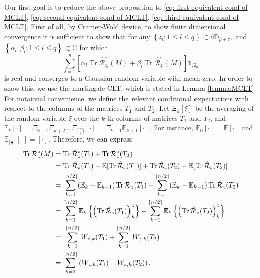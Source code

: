 \documentclass[12pt]{amsart}
\theoremstyle{plain}
\theoremstyle{definition}
\newcommand{\Tr}{\operatorname{Tr}}
\begin{document}
 Our first goal is to reduce the above proposition to \eqref{eq: first equivalent cond of MCLT}, \eqref{eq: second equivalent cond of MCLT}, \eqref{eq: third equivalent cond of MCLT}. First of all, by Cramer-Wold device, to show finite dimensional convergence it is sufficient to show that for any
    $\left\{z_l; 1 \leq l \leq q\right\} \subset \partial \mathbb{D}_{\rho + \tau},$ and $\left\{\alpha_l, \beta_l; 1 \leq l \leq q\right\} \subset \mathbb{C}$ for which
\begin{equation}
    \sum_{l=1}^q\left[\alpha_l \Tr  \hat{\mathcal{R}}_{z_l}^{\circ}(M)+\beta_l \overline{\Tr  \hat{\mathcal{R}}_{z_l}^{\circ}(M)}\right] \mathbf{1}_{\Omega_n}
\end{equation}
is real and converges to a Gaussian random variable with mean zero. In order to show this, we use the martingale CLT, which is stated in Lemma \ref{lemma:MCLT}. For notaional convenience, we define the relevant conditional expectations with respect to the columns of the matrices $T_{1}$ and $T_{2}.$  Let $\Xi_{k}[\xi]$ be the averaging of the random variable $\xi$ over the $k$-th columns of matrices $T_{1}$ and $T_{2}$, and $\mathbb{E}_k[\cdot]=\Xi_{k+1} \Xi_{k+2} \ldots \Xi_{\lceil \frac{n}{2} \rceil}[\cdot]=\Xi_{k+1} \mathbb{E}_{k+1}[\cdot]$. For instance, $\mathbb{E}_0[\cdot]=\mathbb{E}[\cdot]$ and $\mathbb{E}_{\lceil \frac{n}{2}\rceil} [\cdot]=[\cdot]$. Therefore, we can express
\begin{align}
    \Tr  \hat{\mathcal{R}}_z^{\circ}(M) \notag
    &= \Tr  \hat{\mathcal{R}}_z^{\circ}(T_1)+\Tr  \hat{\mathcal{R}}_z^{\circ}(T_2)\\
    &=\Tr \hat{\mathcal{R}}_{z}(T_1)-\mathbb{E}[\Tr \hat{\mathcal{R}}_{z}(T_1)]+\Tr \hat{\mathcal{R}}_{z}(T_2)-\mathbb{E}[\Tr \hat{\mathcal{R}}_{z}(T_2)] \notag\\
    &=   \sum_{k=1}^{\lceil n/2\rceil} (\mathbb{E}_{k}-\mathbb{E}_{k-1})\Tr \hat{\mathcal{R}}_{z}(T_1) +  \sum_{k=1}^{\lceil n/2\rceil} (\mathbb{E}_{k}-\mathbb{E}_{k-1})\Tr \hat{\mathcal{R}}_{z}(T_2) \notag\\
    &=\sum_{k=1}^{\lceil n/2\rceil} \mathbb{E}_k\left\{\left(\Tr  \hat{\mathcal{R}}_z(T_1)\right)_k^\circ\right\}+\sum_{k=1}^{\lceil n/2\rceil} \mathbb{E}_k\left\{\left(\Tr  \hat{\mathcal{R}}_z(T_2)\right)_k^\circ\right\}\notag\\
    &=: \sum_{k=1}^{\lceil n/2\rceil} W_{z, k}(T_1)+\sum_{k=1}^{\lceil n/2\rceil} W_{z, k}(T_2) \notag\\
    &= \sum_{k=1}^{\lceil n/2\rceil}\left(W_{z, k}(T_1)+W_{z, k}(T_2)\right)\label{eq: trace as martingale difference},
\end{align}
\end{document}
